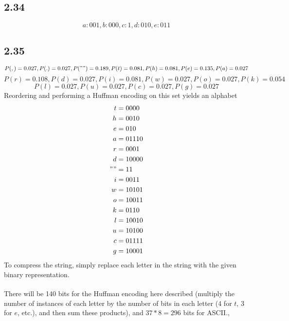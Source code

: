 \documentclass[letterpaper,12pt]{article}
\theoremstyle{definition}
\begin{document}
\subsection*{2.34}
\[{a:001, b:000, c:1, d:010, e:011}\]

\subsection*{2.35}
\[P(,) = 0.027,P(.) = 0.027,P("") = 0.189,P(t) = 0.081,P(h) = 0.081,P(e) = 0.135,P(a) = 0.027\]\[P(r) = 0.108,P(d) = 0.027,P(i) = 0.081,P(w) = 0.027,P(o) = 0.027,P(k) = 0.054\]\[P(l) = 0.027,P(u) = 0.027,P(c) = 0.027,P(g) = 0.027\]
Reordering and performing a Huffman encoding on this set yields an alphabet
\begin{align*}
    t &= 0000 \\
    h &= 0010\\
    e &= 010\\
    a &= 01110\\
    r &= 0001\\
    d &= 10000\\
    "" &= 11\\
    i &= 0011\\
    w &= 10101\\
    o &= 10011\\
    k &= 0110\\
    l &= 10010\\
    u &= 10100\\
    c &= 01111\\
    g &= 10001\\
\end{align*}
To compress the string, simply replace each letter in the string with the given binary representation.\\\\
There will be 
140 bits for the Huffman encoding here described (multiply the number of instances of each letter by the number of bits in each letter (4 for $t$, 3 for $e$, etc.), and then sum these products), and $37*8 = 296$ bits for ASCII.,
\end{document}
